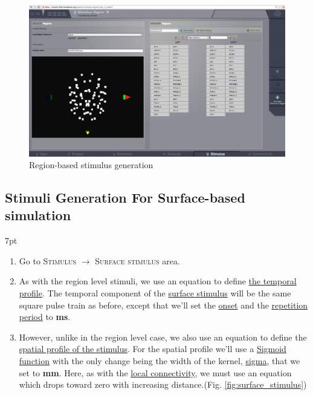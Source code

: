 \documentclass{tufte-handout}
\newenvironment{formal}{%
  \def\FrameCommand{%
    \hspace{1pt}%
    {\color{DarkBlue}\vrule width 2pt}%
    {\color{formalshade}\vrule width 4pt}%
    \colorbox{formalshade}%
  }%
  \MakeFramed{\advance\hsize-\width\FrameRestore}%
  \noindent\hspace{-4.55pt}%
  \begin{adjustwidth}{}{7pt}%
  \vspace{2pt}\vspace{2pt}%
}
{%
  \vspace{2pt}\end{adjustwidth}\endMakeFramed%
}
\begin{document}
\begin{figure}[h]
  \includegraphics[width=\linewidth]{Handout_UI_HeterogenousModelAndStimulation_StimulusRegionScaling}%
  \caption{Region-based stimulus generation}%
  \label{fig:save_scaling}%
\end{figure}


\newpage
\subsection{Stimuli Generation For Surface-based simulation}\label{sec:surface_stim}

\begin{formal}
\begin{enumerate}
\item Go to \textsc{Stimulus} $\rightarrow$ \textsc{Surface stimulus} area. 
\item As with the region level stimuli, we use an equation to define \underline{the temporal
profile}. The temporal component of the \underline{surface stimulus} will be the same square pulse train as before, except that we'll set the \underline{onset} and the \underline{repetition period} to \textbf{\unit[50]{ms}}.
\item  However, unlike in the region level case, we also use an equation to
define the \underline{spatial profile of the stimulus}. For the spatial profile we'll use a \underline{Sigmoid function} with the only change being the width of the kernel, \underline{sigma}, that we set to \textbf{\unit[10]{mm}}.  Here, as with the \underline{local connectivity}, we
must use an equation which drops toward zero with increasing distance.(Fig. \ref{fig:surface_stimulus})
\end{enumerate}
\end{formal}
\end{document}
